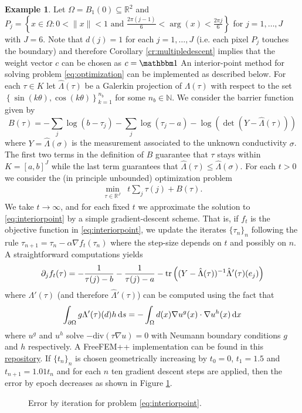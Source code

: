 \documentclass{article}
\theoremstyle{definition}
\newtheorem{example}[theorem]{Example}
\theoremstyle{remark}
\renewcommand{\leq}{\leqslant}
\newcommand{\ones}{\mathbbm1}
\newcommand{\tr}[1]{\textup{tr}\left(#1\right)}
\begin{document}
\begin{example}
Let $\Omega = B_1(0)\subseteq \mathbb R^2$ and $P_j =\left\{ x\in \Omega : 0 < \|x\| < 1 \text{ and } \frac{2\pi(j-1)}{6} < \arg(x) < \frac{2\pi j}{6} \right\}$ for $j=1,\dots,J$ with $J=6$.
Note that $d(j)=1$ for each $j=1,\dots,J$ (i.e. each pixel $P_j$ touches the boundary) and therefore Corollary \ref{cr:multipledescent} implies that the weight vector $c$ can be chosen as $c = \ones$
An interior-point method for solving problem \ref{eq:optimization} can be implemented as described below.
For each $\tau\in K$ let $\hat\Lambda(\tau)$ be a Galerkin projection of $\Lambda(\tau)$ with respect to the set $\left\{ \sin(k\theta),\cos(k\theta)\right\}_{k=1}^{n_b}$ for some $n_b\in\mathbb N$.
We consider the barrier function given by
$$ B(\tau) = -\sum_j\log(b-\tau_j) -\sum_j\log(\tau_j-a) - \log(\det(Y-\hat\Lambda(\tau))) $$
where $Y = \hat\Lambda(\sigma)$ is the measurement associated to the unknown conductivity $\sigma$.
The first two terms in the definition of $B$ guarantee that $\tau$ stays within $K =[a,b]^J$ while the last term guarantees that $\hat\Lambda(\tau)\leq\hat\Lambda(\sigma)$.
For each $t>0$ we consider the (in principle unbounded) optimization problem
\begin{align}
\min_{\tau\in\mathbb R^J}\;\; t\sum_j \tau(j) + B(\tau). \label{eq:interiorpoint}
\end{align}
We take $t\to\infty$, and for each fixed $t$ we approximate the solution to \eqref{eq:interiorpoint} by a simple gradient-descent scheme.
That is, if $f_t$ is the objective function in \eqref{eq:interiorpoint}, we update the iterates $\{\tau_n\}_n$ following the rule $\tau_{n+1}=\tau_n - \alpha \nabla f_t(\tau_n)$ where the step-size depends on $t$ and possibly on $n$.
A straightforward computations yields
$$
\partial_j f_t(\tau) = -\frac{1}{\tau(j)-b} - \frac{1}{\tau(j)-a} - \tr{(Y-\hat\Lambda(\tau))^{-1}\hat\Lambda'(\tau)(e_j)}
$$
where $\Lambda'(\tau)$ (and therefore $\hat\Lambda'(\tau)$) can be computed using the fact that
$$
\int_{\partial\Omega}g\Lambda'(\tau)(d)h\,\text ds = -\int_\Omega d(x)\nabla u^g(x) \cdot \nabla u^h(x) \,\text dx
$$
where $u^g$ and $u^h$ solve $-\text{div}(\tau\nabla u) = 0$ with Neumann boundary conditions $g$ and $h$ respectively.
A FreeFEM++ \cite{freefem} implementation can be found in this \href{https://github.com/jcvillaquira/convex-calderon}{repository}.
If $\{t_n\}_n$ is chosen geometrically increasing by $t_0=0$, $t_1=1.5$ and $t_{n+1} = 1.01 t_n$ and for each $n$ ten gradient descent steps are applied, then the error by epoch decreases as shown in Figure \ref{fig:convexerror}.
\begin{figure}[H]
\centering

\caption{Error by iteration for problem \eqref{eq:interiorpoint}.}
\label{fig:convexerror}
\end{figure}
\end{example}
\end{document}
